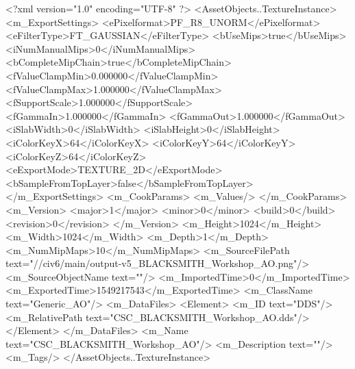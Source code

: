 <?xml version="1.0" encoding="UTF-8" ?>
<AssetObjects..TextureInstance>
	<m_ExportSettings>
		<ePixelformat>PF_R8_UNORM</ePixelformat>
		<eFilterType>FT_GAUSSIAN</eFilterType>
		<bUseMips>true</bUseMips>
		<iNumManualMips>0</iNumManualMips>
		<bCompleteMipChain>true</bCompleteMipChain>
		<fValueClampMin>0.000000</fValueClampMin>
		<fValueClampMax>1.000000</fValueClampMax>
		<fSupportScale>1.000000</fSupportScale>
		<fGammaIn>1.000000</fGammaIn>
		<fGammaOut>1.000000</fGammaOut>
		<iSlabWidth>0</iSlabWidth>
		<iSlabHeight>0</iSlabHeight>
		<iColorKeyX>64</iColorKeyX>
		<iColorKeyY>64</iColorKeyY>
		<iColorKeyZ>64</iColorKeyZ>
		<eExportMode>TEXTURE_2D</eExportMode>
		<bSampleFromTopLayer>false</bSampleFromTopLayer>
	</m_ExportSettings>
	<m_CookParams>
		<m_Values/>
	</m_CookParams>
	<m_Version>
		<major>1</major>
		<minor>0</minor>
		<build>0</build>
		<revision>0</revision>
	</m_Version>
	<m_Height>1024</m_Height>
	<m_Width>1024</m_Width>
	<m_Depth>1</m_Depth>
	<m_NumMipMaps>10</m_NumMipMaps>
	<m_SourceFilePath text="//civ6/main/output\blacksmith-v5\Textures\CSC_BLACKSMITH_Workshop_AO.png"/>
	<m_SourceObjectName text=""/>
	<m_ImportedTime>0</m_ImportedTime>
	<m_ExportedTime>1549217543</m_ExportedTime>
	<m_ClassName text="Generic_AO"/>
	<m_DataFiles>
		<Element>
			<m_ID text="DDS"/>
			<m_RelativePath text="CSC_BLACKSMITH_Workshop_AO.dds"/>
		</Element>
	</m_DataFiles>
	<m_Name text="CSC_BLACKSMITH_Workshop_AO"/>
	<m_Description text=""/>
	<m_Tags/>
</AssetObjects..TextureInstance>

